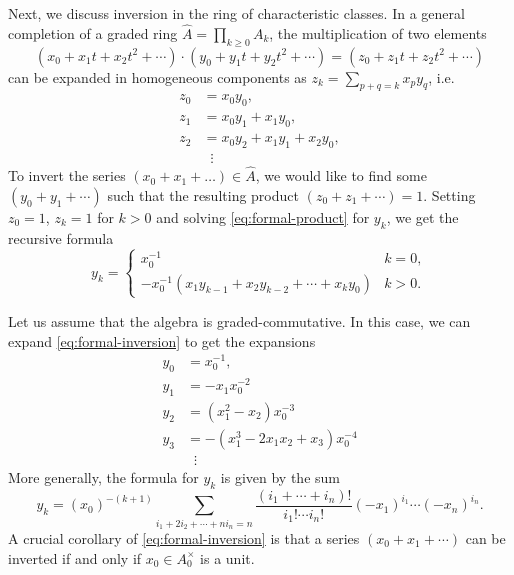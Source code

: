 Next, we discuss inversion in the ring of characteristic classes.
In a general completion of a graded ring $\widehat{A}=\prod_{k\geq 0}A_k$, the multiplication of two elements
\[
	(x_0+x_1t +x_2t^2+\cdots)\cdot (y_0+y_1t+y_2t^2+\cdots) = (z_0 + z_1t + z_2t^2+\cdots)
\]
can be expanded in homogeneous components as $z_k=\sum_{p+q=k} x_py_q$, i.e.
\begin{equation}\label{eq:formal-product}
	\begin{aligned}
		z_0 & = x_0y_0,                 \\
		z_1 & = x_0y_1 + x_1y_0,        \\
		z_2 & = x_0y_2 + x_1y_1+x_2y_0, \\
		    & \;\;\vdots
	\end{aligned}
\end{equation}
To invert the series $(x_0+ x_1+\ldots)\in \widehat{A}$, we would like to find some $(y_0+y_1+\cdots)$ such that the resulting product $(z_0+z_1+\cdots)=1$. Setting $z_0=1$, $z_k=1$ for $k>0$ and solving \cref{eq:formal-product} for $y_k$, we get the recursive formula
\begin{equation}\label{eq:formal-inversion}
	y_k = \begin{cases}x_0^{-1}                                        & k=0,   \\
             -x_0^{-1}(x_1y_{k-1}+x_2y_{k-2}+\cdots +x_ky_0) & k > 0.
	\end{cases}
\end{equation}

Let us assume that the algebra is graded-commutative. In this case, we can expand \cref{eq:formal-inversion} to get the expansions
\[
	\begin{aligned}
		y_0 & = x_0^{-1},                        \\
		y_1 & = -x_1x_0^{-2}                     \\
		y_2 & = (x_1^2-x_2)x_0^{-3}              \\
		y_3 & = -(x_1^3 - 2x_1x_2 + x_3)x_0^{-4} \\
		    & \;\;\vdots
	\end{aligned}
\]
More generally, the formula for $y_k$ is given by the sum
\begin{equation}\label{eq:general-formal-inversion}
	y_k = (x_0)^{-(k+1)}\sum_{i_1+2i_2+\cdots+ni_n=n} \frac{(i_1+\cdots+i_n)!}{i_1!\cdots i_n!}(-x_1)^{i_1}\cdots (-x_n)^{i_n}.
\end{equation}
A crucial corollary of \cref{eq:formal-inversion} is that a series $(x_0+x_1+\cdots)$ can be inverted if and only if $x_0\in A_0^\times$ is a unit.

